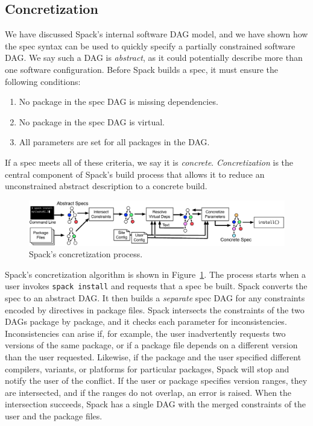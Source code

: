 
\subsection{Concretization}
\label{sec:concretization}

We have discussed Spack's internal software DAG model, and we have shown
how the spec syntax can be used to quickly specify a partially constrained
software DAG.  We say such a DAG is {\it abstract}, as it could potentially
describe more than one software configuration. Before Spack builds a spec, it
must ensure the following conditions:
\begin{enumerate}
\item No package in the spec DAG is missing dependencies.
\item No package in the spec DAG is virtual.
\item All parameters are set for all packages in the DAG.
\end{enumerate}
If a spec meets all of these criteria, we say it is {\it concrete}.
{\it Concretization} is the central component of Spack's build
process that allows it to reduce an unconstrained abstract
description to a concrete build.

\begin{figure}
	\centering
	\includegraphics[width=\textwidth]{figs/concretization.pdf}
	\caption{
		Spack's concretization process.
		\label{fig:concretization}
	}
\end{figure}

Spack's concretization algorithm is shown in Figure~\ref{fig:concretization}.
The process starts when a user invokes {\tt spack install} and requests that a
spec be built.  Spack converts the spec to an abstract DAG.
It then builds a {\it separate} spec DAG for any constraints encoded
by directives in package files.
%
Spack intersects the constraints of the two DAGs package by package, and it
checks each parameter for inconsistencies.  Inconsistencies can arise if, for example,
the user inadvertently requests two versions of the same package, or if a
package file depends on a different version than the user requested.
Likewise, if the package and the user specified different compilers, variants,
or platforms for particular packages, Spack will stop and notify
the user of the conflict. If the user or package specifies version ranges,
they are intersected, and if the ranges do not overlap, an error is raised.
When the intersection succeeds, Spack has a single DAG with the merged
constraints of the user and the package files.


